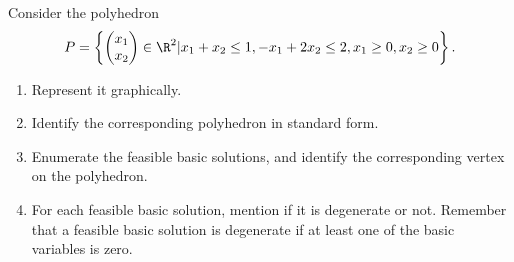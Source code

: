 Consider the polyhedron
\[
P = \left\{
\begin{pmatrix}
x_1\\
x_2
\end{pmatrix} \in \R^2
| x_1+x_2 \leq 1,
-x_1+2x_2 \leq 2, x_1 \geq 0, x_2 \geq 0 \right\}.
\]
\begin{enumerate}
\item Represent it graphically.
\item Identify the corresponding polyhedron in standard form.
\item Enumerate the feasible basic solutions, and identify the
  corresponding vertex on the polyhedron.
\item For each feasible basic solution, mention if it is degenerate or
  not.  Remember that a feasible basic solution is degenerate if at
  least one of the basic variables is zero.
\end{enumerate}

